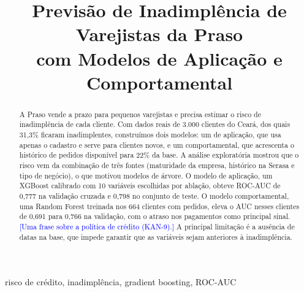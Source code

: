 \documentclass[conference]{IEEEtran}
\newcommand{\nota}[1]{\textcolor{blue}{[#1]}}
\begin{document}
\title{Previsão de Inadimplência de Varejistas da Praso\\com Modelos de Aplicação e Comportamental}

\author{
\and
{}
\and
{}
\and
{}
}

\maketitle

\begin{abstract}
A Praso vende a prazo para pequenos varejistas e precisa estimar o risco de inadimplência de cada cliente. Com dados reais de 3.000 clientes do Ceará, dos quais 31,3\% ficaram inadimplentes, construímos dois modelos: um de aplicação, que usa apenas o cadastro e serve para clientes novos, e um comportamental, que acrescenta o histórico de pedidos disponível para 22\% da base. A análise exploratória mostrou que o risco vem da combinação de três fontes (maturidade da empresa, histórico na Serasa e tipo de negócio), o que motivou modelos de árvore. O modelo de aplicação, um XGBoost calibrado com 10 variáveis escolhidas por ablação, obteve ROC-AUC de 0,777 na validação cruzada e 0,798 no conjunto de teste. O modelo comportamental, uma Random Forest treinada nos 664 clientes com pedidos, eleva o AUC nesses clientes de 0,691 para 0,766 na validação, com o atraso nos pagamentos como principal sinal. \nota{Uma frase sobre a política de crédito (KAN-9).} A principal limitação é a ausência de datas na base, que impede garantir que as variáveis sejam anteriores à inadimplência.
\end{abstract}

\begin{IEEEkeywords}
risco de crédito, inadimplência, gradient boosting, ROC-AUC
\end{IEEEkeywords}
\end{document}
